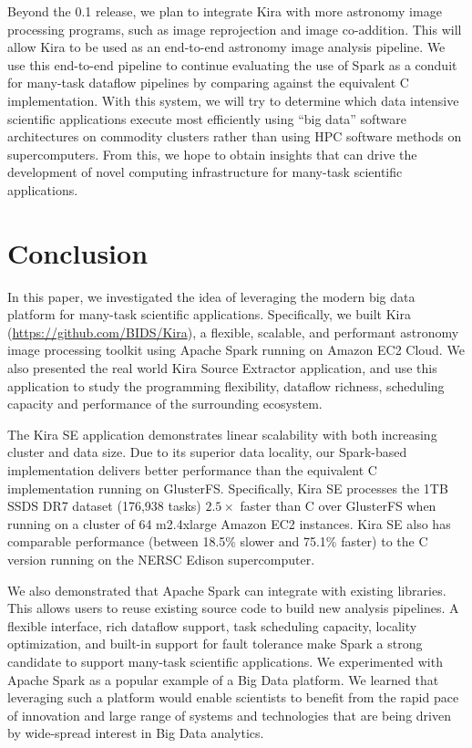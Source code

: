 \documentclass[conference]{IEEEtran}
\begin{document}
Beyond the 0.1 release, we plan to integrate Kira with more astronomy image processing
programs, such as image reprojection and image co-addition. This will allow Kira to be
used as an end-to-end astronomy image analysis pipeline. We use this end-to-end pipeline
to continue evaluating the use of Spark as a conduit for many-task dataflow pipelines by
comparing against the equivalent C implementation. With this system, we will try to determine
which data intensive scientific applications execute most efficiently using ``big data''
software architectures on commodity clusters rather than using HPC software methods on supercomputers.
From this, we hope to obtain insights that can drive the development of novel computing
infrastructure for many-task scientific applications.

\section{Conclusion}
\label{sec:Conclusion}

In this paper, we investigated the idea of leveraging the modern big data platform for many-task
scientific applications. Specifically, we built Kira (\url{https://github.com/BIDS/Kira}), a flexible, scalable,
and performant astronomy image processing toolkit using Apache Spark running on Amazon EC2 Cloud. We also presented
the real world Kira Source Extractor application, and use this application to study the programming
flexibility, dataflow richness, scheduling capacity and performance of the surrounding ecosystem.

The Kira SE application demonstrates linear scalability with both increasing cluster and data
size. Due to its superior data locality, our Spark-based implementation delivers better performance than the equivalent C 
implementation running on GlusterFS. Specifically, Kira SE processes the 1TB SSDS DR7 dataset (176,938 tasks)
$2.5\times$ faster than C over GlusterFS when running on a cluster of 64 m2.4xlarge Amazon
EC2 instances. Kira SE also has comparable performance (between 18.5\% slower and 75.1\% faster)
to the C version running on the NERSC Edison supercomputer.  

We also demonstrated that Apache Spark can integrate with existing libraries.
This allows users to reuse existing source code to build new analysis pipelines.
A flexible interface, rich dataflow support, task scheduling capacity, locality optimization, and built-in support for fault tolerance make Spark a 
strong candidate to support many-task scientific applications. 
We experimented with Apache Spark as a popular example of a Big Data platform. We learned that
leveraging such a platform would enable scientists to benefit from the rapid pace of innovation 
and large range of systems and technologies that are being driven by wide-spread interest in Big Data analytics.
\end{document}
